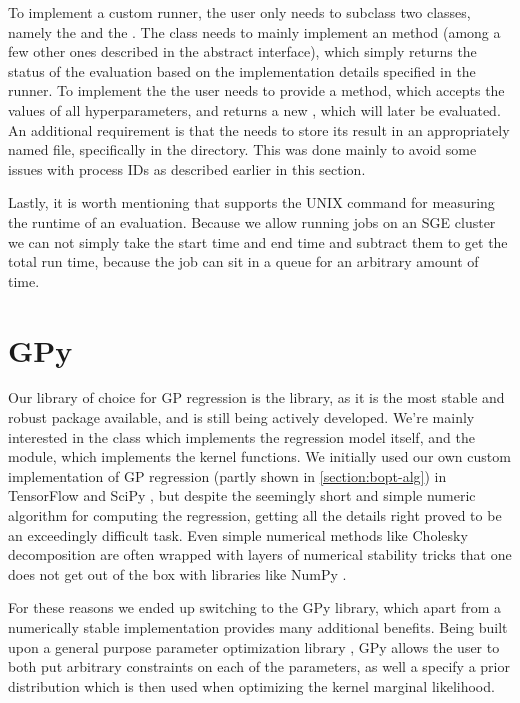 To implement a custom runner, the user only needs to subclass two classes, namely the  and the . The  class needs to mainly implement an  method (among a few other ones described in the abstract interface), which simply returns the status of the evaluation based on the implementation details specified in the runner. To implement the  the user needs to provide a  method, which accepts the values of all hyperparameters, and returns a new , which will later be evaluated. An additional requirement is that the  needs to store its result in an appropriately named file, specifically  in the  directory. This was done mainly to avoid some issues with process IDs as described earlier in this section.

Lastly, it is worth mentioning that \bopt supports the UNIX  command for measuring the runtime of an evaluation. Because we allow running jobs on an SGE cluster we can not simply take the start time and end time and subtract them to get the total run time, because the job can sit in a queue for an arbitrary amount of time.

\section{GPy}
\label{section:gpy}

Our library of choice for GP regression is the \cite{gpy2014} library, as it is the most stable and robust package available, and is still being actively developed. We're mainly interested in the  class which implements the regression model itself, and the  module, which implements the kernel functions. We initially used our own custom implementation of GP regression (partly shown in \autoref{section:bopt-alg}) in TensorFlow \citep{tensorflow2015-whitepaper} and SciPy \citep{scipy}, but despite the seemingly short and simple numeric algorithm for computing the regression, getting all the details right proved to be an exceedingly difficult task. Even simple numerical methods like Cholesky decomposition are often wrapped with layers of numerical stability tricks that one does not get out of the box with libraries like NumPy \citep{numpy}.

For these reasons we ended up switching to the GPy library, which apart from a numerically stable implementation provides many additional benefits. Being built upon a general purpose parameter optimization library \cite{paramz}, GPy allows the user to both put arbitrary constraints on each of the parameters, as well a specify a prior distribution which is then used when optimizing the kernel marginal likelihood.

